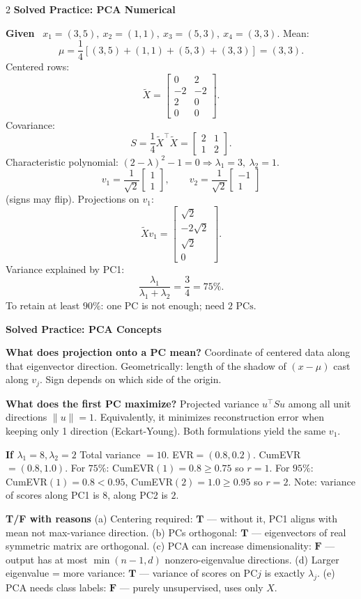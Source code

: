 \documentclass[10pt,fleqn]{article}
\newcommand{\shead}[1]{\vspace{0.1ex}\textbf{\scriptsize #1}\par}
\newcommand{\topic}[1]{\textbf{#1}\ }
\newcommand{\qa}[2]{\textbf{#1} #2\par}
\begin{document}
\begin{multicols*}{2}
\shead{Solved Practice: PCA Numerical}
\topic{Given} \(x_1=(3,5),\ x_2=(1,1),\ x_3=(5,3),\ x_4=(3,3)\). Mean:
\[
\mu=\frac14[(3,5)+(1,1)+(5,3)+(3,3)]=(3,3).
\]
Centered rows:
\[
\widetilde X=
\begin{bmatrix}
0&2\\
-2&-2\\
2&0\\
0&0
\end{bmatrix}.
\]
Covariance:
\[
S=\frac14\widetilde X^\top\widetilde X=
\begin{bmatrix}
2&1\\
1&2
\end{bmatrix}.
\]
Characteristic polynomial: \((2-\lambda)^2-1=0\Rightarrow \lambda_1=3,\ \lambda_2=1\).
\[
v_1=\frac1{\sqrt2}\begin{bmatrix}1\\1\end{bmatrix},\qquad
v_2=\frac1{\sqrt2}\begin{bmatrix}-1\\1\end{bmatrix}
\]
(signs may flip). Projections on \(v_1\):
\[
\widetilde Xv_1=
\begin{bmatrix}
\sqrt2\\
-2\sqrt2\\
\sqrt2\\
0
\end{bmatrix}.
\]
Variance explained by PC1:
\[
\frac{\lambda_1}{\lambda_1+\lambda_2}=\frac34=75\%.
\]
To retain at least \(90\%\): one PC is not enough; need \(\boxed{2\text{ PCs}}\).

\shead{Solved Practice: PCA Concepts}
\qa{What does projection onto a PC mean?}{Coordinate of centered data along that eigenvector direction. Geometrically: length of the shadow of \((x-\mu)\) cast along \(v_j\). Sign depends on which side of the origin.}
\qa{What does the first PC maximize?}{Projected variance \(u^\top Su\) among all unit directions \(\|u\|=1\). Equivalently, it minimizes reconstruction error when keeping only 1 direction (Eckart-Young). Both formulations yield the same \(v_1\).}
\qa{If \(\lambda_1=8,\lambda_2=2\)}{Total variance \(=10\). EVR\(=(0.8,0.2)\). CumEVR\(=(0.8,1.0)\). For \(75\%\): CumEVR\((1)=0.8\ge 0.75\) so \(r=\boxed{1}\). For \(95\%\): CumEVR\((1)=0.8<0.95\), CumEVR\((2)=1.0\ge 0.95\) so \(r=\boxed{2}\). Note: variance of scores along PC1 is \(8\), along PC2 is \(2\).}
\qa{T/F with reasons}{(a) Centering required: \(\mathbf{T}\) — without it, PC1 aligns with mean not max-variance direction. (b) PCs orthogonal: \(\mathbf{T}\) — eigenvectors of real symmetric matrix are orthogonal. (c) PCA can increase dimensionality: \(\mathbf{F}\) — output has at most \(\min(n-1,d)\) nonzero-eigenvalue directions. (d) Larger eigenvalue = more variance: \(\mathbf{T}\) — variance of scores on PC\(j\) is exactly \(\lambda_j\). (e) PCA needs class labels: \(\mathbf{F}\) — purely unsupervised, uses only \(X\).}


\end{multicols*}
\end{document}
